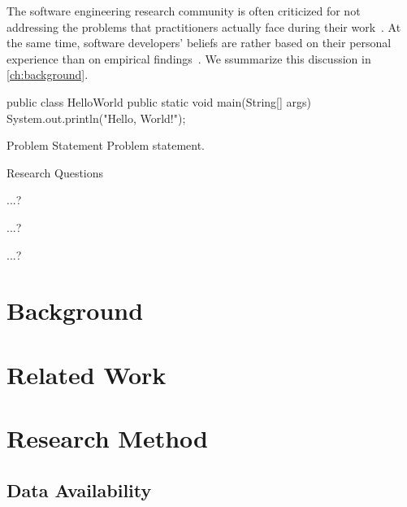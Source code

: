 The software engineering research community is often criticized for not addressing the problems that practitioners actually face during their work~\cite{Briand2012}.
At the same time, software developers' beliefs are rather based on their personal experience than on empirical findings~\cite{DevanbuZimmermannOthers2016}.
We s\textsf{s}ummarize this discussion in \autoref{ch:background}.

\begin{java}
public class HelloWorld {
  public static void main(String[] args) {
    System.out.println("Hello, World!");
  }
}
\end{java}


\begin{graybox}{Problem Statement}
Problem statement.
\end{graybox}


\begin{graybox}{Research Questions}
\begin{description}[style=multiline, labelindent=\parindent, leftmargin=\rqindent, itemsep=-1ex]
\item[RQ1] ...?
\item[RQ2] ...?
\item[RQ3] ...?
\end{description}
\end{graybox}

\chapter{Background}
\label{ch:background}

\lipsum[1-12]

\chapter{Related Work}
\label{ch:related-work}

\lipsum[1-4]

\chapter{Research Method}
\label{ch:research-method}

\lipsum[1-4]

\section{Data Availability}
\label{sec:data-availability}

